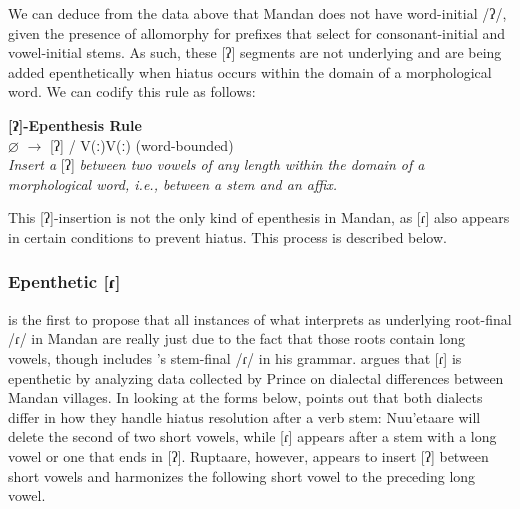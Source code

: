 We can deduce from the data above that Mandan does not have word-initial /ʔ/, given the presence of allomorphy for prefixes that select for consonant-initial and vowel-initial stems. As such, these [ʔ] segments are not underlying and are being added epenthetically when hiatus occurs within the domain of a morphological word. We can codify this rule as follows:

\begin{exe}

\item\label{GlottalStopEpenthesisRule} \textbf{[ʔ]-Epenthesis Rule}\\
	$\varnothing$ $\to$ [ʔ] / V(ː){\longrule}V(ː) (word-bounded)\\
	\textit{Insert a} [ʔ] \textit{between two vowels of any length within the domain of a morphological word, i.e., between a stem and an affix.}

\end{exe}

This [ʔ]-insertion is not the only kind of epenthesis in Mandan, as [ɾ] also appears in certain conditions to prevent hiatus. This process is described below.

\subsubsection{Epenthetic [ɾ]}\label{intrusiveR}

\citet{carter1991a} is the first to propose that all instances of what \citet{hollow1970} interprets as underlying root-final /ɾ/ in Mandan are really just due to the fact that those roots contain long vowels, though \citet{mixco1997a} includes \citeauthor{hollow1970}'s stem-final /ɾ/ in his grammar. \citeauthor{carter1991a} argues that [ɾ] is epenthetic by analyzing data collected by Prince \citet{maximilian1839} on dialectal differences between Mandan villages. In looking at the forms below, \citeauthor{carter1991a} points out that both dialects differ in how they handle hiatus resolution after a verb stem: Nuu'etaare will delete the second of two short vowels, while [ɾ] appears after a stem with a long vowel or one that ends in [ʔ]. Ruptaare, however, appears to insert [ʔ] between short vowels and harmonizes the following short vowel to the preceding long vowel.

